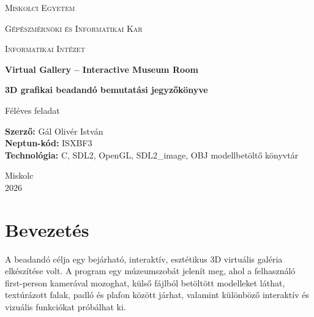 \documentclass[12pt,a4paper]{article}
\begin{document}
\begin{titlepage}
    \centering

    {\scshape\LARGE Miskolci Egyetem \par}
    \vspace{0.5cm}
    {\scshape\Large Gépészmérnöki és Informatikai Kar \par}
    \vspace{0.5cm}
    {\scshape\large Informatikai Intézet \par}

    \vspace{2.2cm}

    {\Huge\bfseries Virtual Gallery -- Interactive Museum Room\par}
    \vspace{0.45cm}
    {\Large\bfseries 3D grafikai beadandó bemutatási jegyzőkönyve\par}

    \vspace{1.6cm}

    {\Large Féléves feladat\par}

    \vfill

    \begin{flushleft}
        \large
        \textbf{Szerző:} Gál Olivér István \\
        \textbf{Neptun-kód:} ISXBF3 \\
        \textbf{Technológia:} C, SDL2, OpenGL, SDL2\_image, OBJ modellbetöltő könyvtár
    \end{flushleft}

    \vspace{1cm}

    \begin{flushright}
        \large
        Miskolc \\
        2026
    \end{flushright}

\end{titlepage}

\tableofcontents
\newpage

\section{Bevezetés}

A beadandó célja egy bejárható, interaktív, esztétikus 3D virtuális galéria elkészítése volt. A program egy múzeumszobát jelenít meg, ahol a felhasználó first-person kamerával mozoghat, külső fájlból betöltött modelleket láthat, textúrázott falak, padló és plafon között járhat, valamint különböző interaktív és vizuális funkciókat próbálhat ki.
\end{document}
